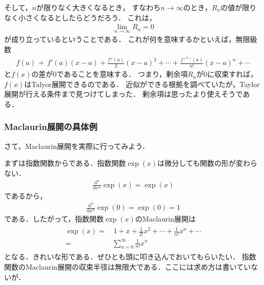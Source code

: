 そして，$n$が限りなく大きくなるとき，
すなわち$n \to \infty$のとき，$R_n$の値が限りなく小さくなるとしたらどうだろう．
これは，
\begin{align*}
\lim_{n \to \infty} R_n = 0
\end{align*}
が成り立っているということである．
これが何を意味するかといえば，無限級数
\begin{align*}
 f(a) \, + \,  f'(a)(x-a) + \frac{f''(a)}{2}(x-a)^2 + \cdots + \frac{f^{(n)}(a)}{n!}(x-a)^n + \cdots
 \end{align*}
と$f(x)$の差が0であることを意味する．
つまり，剰余項{$R_n$}が0に収束すれば，{$f(x)$}はTalyor展開できるのである．
近似ができる根拠を調べていたが，Taylor展開が行える条件まで見つけてしまった．
剰余項は思ったより使えそうである．

\subsubsection{\bf{Maclaurin}展開の具体例}
さて，Maclaurin展開を実際に行ってみよう．

まずは指数関数からである．指数関数$\exp (x)$は微分しても関数の形が変わらない．
\begin{align*}
\frac{\mathrm{d}^n}{\mathrm{d}x^n} \exp(x) = \exp (x)
\end{align*}
であるから，
\begin{align*}
\frac{\mathrm{d}^n}{\mathrm{d}x^n} \exp(0) = \exp (0) = 1
\end{align*}
である．したがって，指数関数$\exp (x)$のMaclaurin展開は
\begin{align}
\begin{aligned}
\exp(x) = & \, 1 + x +\frac{1}{2!} x^2 + \cdots + \frac{1}{n!} x^n + \cdots \\
= & \sum_{n=0}^{\infty} \frac{1}{n!} x^n 
\label{eq:sisuukannsuu}
\end{aligned}
\end{align}
となる．きれいな形である．ぜひとも頭に叩き込んでおいてもらいたい．
指数関数のMaclaurin展開の収束半径は無限大である．ここには求め方は書いていないが．

